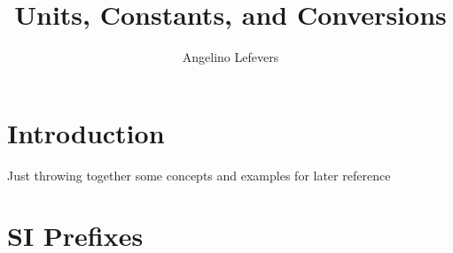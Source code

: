 \documentclass{article}
\begin{document}
\title{Units, Constants, and Conversions}
\author{Angelino Lefevers}
\maketitle
\thispagestyle{empty}
\cleardoublepage
\tableofcontents
\thispagestyle{empty}
\cleardoublepage
\section*{Introduction}
Just throwing together some concepts and examples for later reference
\cleardoublepage
{}
\setcounter{page}{1}
\section{SI Prefixes}
\end{document}
